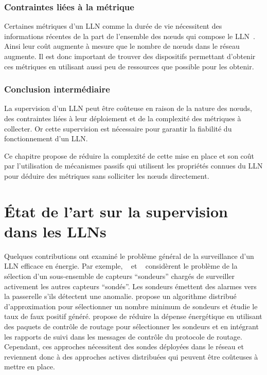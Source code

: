 \subsubsection{Contraintes liées à la métrique}

Certaines métriques d'un \ac{LLN} comme la durée de vie nécessitent des informations récentes de la part de l'ensemble des nœuds qui compose le \ac{LLN}~\cite{chen2005lifetime}.
Ainsi leur coût augmente à mesure que le nombre de nœuds dans le réseau augmente.
Il est donc important de trouver des dispositifs permettant d'obtenir ces métriques en utilisant aussi peu de ressources que possible pour les obtenir.

\subsubsection*{Conclusion intermédiaire}

La supervision d'un \ac{LLN} peut être coûteuse en raison de la nature des nœuds, des contraintes liées à leur déploiement et de la complexité des métriques à collecter.
Or cette supervision est nécessaire pour garantir la fiabilité du fonctionnement d'un \ac{LLN}.

Ce chapitre propose de réduire la complexité de cette mise en place et son coût par l'utilisation de mécanismes passifs qui utilisent les propriétés connues du \ac{LLN} pour déduire des métriques sans solliciter les nœuds directement.

\section{État de l'art sur la supervision dans les \ac{LLN}s}
\label{supervision:related}

Quelques contributions ont examiné le problème général de la surveillance d'un \ac{LLN} efficace en énergie.
Par exemple, ~\cite{Liu:2010dz} et ~\cite{Lahmadi:2013tw} considèrent le problème de la sélection d'un sous-ensemble de capteurs ``sondeurs'' chargés de surveiller activement les autres capteurs ``sondés''.
Les sondeurs émettent des alarmes vers la passerelle s'ils détectent une anomalie.
\cite{Liu:2010dz} propose un algorithme distribué d'approximation pour sélectionner un nombre minimum de sondeurs et étudie le taux de faux positif généré.
\cite{Lahmadi:2013tw} propose de réduire la dépense énergétique en utilisant des paquets de contrôle de routage pour sélectionner les sondeurs et en intégrant les rapports de suivi dans les messages de contrôle du protocole de routage.
Cependant, ces approches nécessitent des sondes déployées dans le réseau et reviennent donc à des approches actives distribuées qui peuvent être coûteuses à mettre en place.

